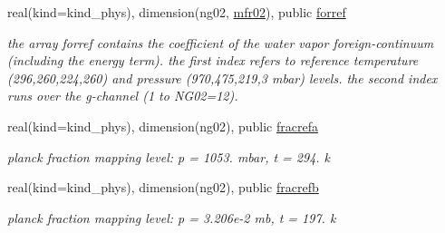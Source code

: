 \begin{DoxyCompactItemize}
real(kind=kind\+\_\+phys), dimension(ng02, \hyperlink{group__module__radlw__kgbnn_ga2973c2e9220e85b74f0b251c896aa837}{mfr02}), public \hyperlink{group__module__radlw__kgbnn_gaf6f3d7a0ab6858eab9d4d3e2d2d68031}{forref}
\begin{DoxyCompactList}\small\item\em the array forref contains the coefficient of the water vapor foreign-\/continuum (including the energy term). the first index refers to reference temperature (296,260,224,260) and pressure (970,475,219,3 mbar) levels. the second index runs over the g-\/channel (1 to N\+G02=12). \end{DoxyCompactList}\item 
real(kind=kind\+\_\+phys), dimension(ng02), public \hyperlink{group__module__radlw__kgbnn_gaf6db1580bd4a8b037cdd3e14765e2c83}{fracrefa}
\begin{DoxyCompactList}\small\item\em planck fraction mapping level\+: p = 1053. mbar, t = 294. k \end{DoxyCompactList}\item 
real(kind=kind\+\_\+phys), dimension(ng02), public \hyperlink{group__module__radlw__kgbnn_gaeedda30c8d2bd7c9e7124c6445c8c20e}{fracrefb}
\begin{DoxyCompactList}\small\item\em planck fraction mapping level\+: p = 3.\+206e-\/2 mb, t = 197. k \end{DoxyCompactList}\end{DoxyCompactItemize}
